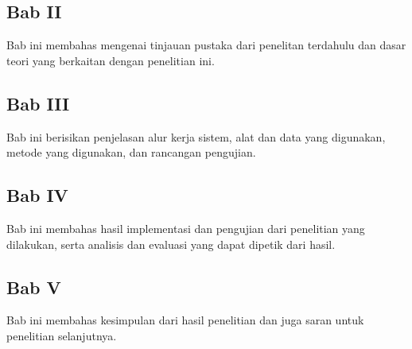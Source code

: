 \subsection*{Bab II}
Bab ini membahas mengenai tinjauan pustaka dari penelitan terdahulu dan dasar teori yang berkaitan dengan penelitian ini.

\subsection*{Bab III}
Bab ini berisikan penjelasan alur kerja sistem, alat dan data yang digunakan, metode yang digunakan, dan rancangan pengujian.

\subsection*{Bab IV}
Bab ini membahas hasil implementasi dan pengujian dari penelitian yang dilakukan, serta analisis dan evaluasi yang dapat dipetik dari hasil.

\subsection*{Bab V}
Bab ini membahas kesimpulan dari hasil penelitian dan juga saran untuk penelitian selanjutnya.